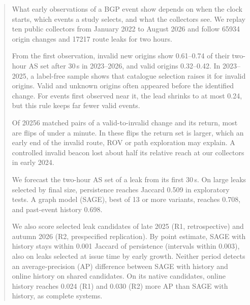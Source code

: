 \begin{abstract}
What early observations of a BGP event show depends on when the clock starts, which events a study selects, and what the collectors see.
We replay ten public collectors from January 2022 to August 2026 and follow \num{65934} origin changes and \num{17217} route leaks for two hours.

From the first observation, invalid new origins show 0.61--0.74 of their two-hour AS set after 30\,s in 2023--2026, and valid origins 0.32--0.42.
In 2023--2025, a label-free sample shows that catalogue selection raises it for invalid origins.
Valid and unknown origins often appeared before the identified change.
For events first observed near it, the lead shrinks to at most 0.24, but this rule keeps far fewer valid events.

Of \num{20256} matched pairs of a valid-to-invalid change and its return, most are flips of under a minute.
In these flips the return set is larger, which an early end of the invalid route, ROV or path exploration may explain.
A controlled invalid beacon lost about half its relative reach at our collectors in early 2024.

We forecast the two-hour AS set of a leak from its first 30\,s.
On large leaks selected by final size, persistence reaches Jaccard 0.509 in exploratory tests.
A graph model (SAGE), best of 13 or more variants, reaches 0.708, and past-event history 0.698.

We also score selected leak candidates of late 2025 (R1, retrospective) and autumn 2026 (R2, prespecified replication).
By point estimate, SAGE with history stays within 0.001 Jaccard of persistence (intervals within 0.003), also on leaks selected at issue time by early growth.
Neither period detects an average-precision (AP) difference between SAGE with history and online history on shared candidates.
On its native candidates, online history reaches 0.024 (R1) and 0.030 (R2) more AP than SAGE with history, as complete systems.


\end{abstract}
